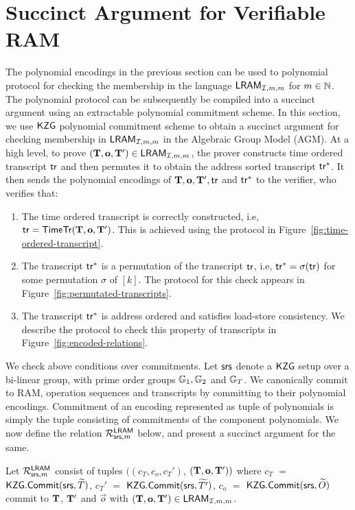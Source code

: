 \section{Succinct Argument for Verifiable RAM}\label{sec:poly-proto-ram}
The polynomial encodings in the previous section can be used to polynomial protocol for
checking the membership in the language $\mathsf{LRAM}_{\mathcal{I},m,m}$ for $m\in \mathbb{N}$. The polynomial protocol can be subsequently
be compiled into a succinct argument using an extractable polynomial commitment scheme.
In this section, we use $\mathsf{KZG}$ polynomial commitment scheme to obtain a succinct argument for checking membership in $\mathsf{LRAM}_{\mathcal{I},m,m}$
in the Algebraic Group Model (AGM).
At a high level, to prove $(\mathbf{T},\mathbf{o},\mathbf{T}')\in \mathsf{LRAM}_{\mathcal{I},m,m}$, the prover
constructs time ordered transcript $\mathsf{tr}$ and then permutes it to obtain the address sorted transcript $\mathsf{tr}^\ast$.
It then sends the polynomial encodings of $\mathbf{T},\mathbf{o},\mathbf{T}',\mathsf{tr}$ and $\mathsf{tr}^\ast$ to the verifier, who verifies that:
\begin{enumerate}[leftmargin=2em]
    \item The time ordered transcript is correctly constructed, i.e, $\mathsf{tr}=\mathsf{TimeTr}(\mathbf{T},\mathbf{o},\mathbf{T}')$.
     This is achieved using the protocol in Figure~\ref{fig:time-ordered-transcript}.
    \item The transcript $\mathsf{tr}^\ast$ is a permutation of the transcript $\mathsf{tr}$, i.e, $\mathsf{tr}^\ast=\sigma(\mathsf{tr})$ for some permutation $\sigma$ of $[k]$.
    The protocol for this check appears in Figure~\ref{fig:permutated-transcripts}.
    \item The transcript $\mathsf{tr}^\ast$ is address ordered and satisfies load-store consistency. We describe the protocol
    to check this property of transcripts in Figure~\ref{fig:encoded-relations}.
\end{enumerate}
We check above conditions over commitments. Let $\mathsf{srs}$ denote a $\mathsf{KZG}$ setup over a bi-linear group, with
prime order groups $\mathbb{G}_1, \mathbb{G}_2$ and $\mathbb{G}_T$. We canonically commit to RAM, operation sequences and transcripts by committing to their
polynomial encodings. Commitment of an encoding represented as tuple of polynomials is simply the tuple consisting of commitments of the component
polynomials. We now define
the relation $\mathcal{R}^{\mathsf{LRAM}}_{\mathsf{srs},m}$ below, and present a succinct argument for the same.
\begin{definition}\label{defn:committed-vram}
Let $\mathcal{R}^{\mathsf{LRAM}}_{\mathsf{srs},m}$ consist of tuples $((c_T, c_o, c_T')$, $(\mathbf{T}, \mathbf{o},\mathbf{T}'))$ where $c_T$ $=$ $\mathsf{KZG.Commit}(\mathsf{srs}, \widetilde{T})$,
$c_T'$ $=$ $\mathsf{KZG.Commit}(\mathsf{srs}, \widetilde{T'})$,
$c_o$ $=$ $\mathsf{KZG.Commit}(\mathsf{srs},\widetilde{O})$ commit to $\mathbf{T}$, $\mathbf{T}'$ and $\vec{o}$ with $(\mathbf{T},\mathbf{o},\mathbf{T}')\in \mathsf{LRAM}_{\mathcal{I},m,m}$.
\end{definition}
